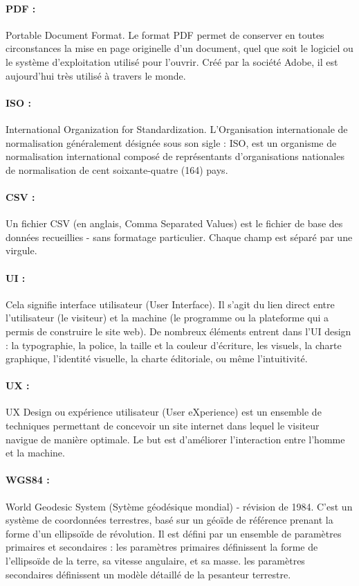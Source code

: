 \paragraph{PDF :}
Portable Document Format. Le format PDF permet de conserver en 
toutes circonstances la mise en page 
originelle d'un document, quel que soit le logiciel ou le système 
d'exploitation utilisé pour l'ouvrir. Créé par la société Adobe, 
il est aujourd'hui très utilisé à travers le monde.

\paragraph{ISO :}
International Organization for Standardization.
L'Organisation internationale de normalisation généralement désignée sous son
 sigle : ISO, est un organisme de normalisation international composé de 
 représentants d'organisations nationales de normalisation de cent soixante-quatre (164) pays.


\paragraph{CSV :}
Un fichier CSV (en anglais, Comma Separated Values) est le fichier de 
base des données recueillies - sans formatage particulier. Chaque 
champ est séparé par une virgule.

\paragraph{UI :}
Cela signifie interface utilisateur (User Interface). 
Il s’agit du lien direct entre l’utilisateur (le visiteur) 
et la machine (le programme ou la plateforme qui a permis de construire 
le site web). De nombreux éléments entrent dans l’UI design : la typographie, la police, la taille et la 
couleur d’écriture, les visuels, la charte graphique, l'identité visuelle, la
charte éditoriale, ou même l’intuitivité.

\paragraph{UX :}
UX Design ou expérience utilisateur (User eXperience) est un ensemble de techniques 
permettant de concevoir un site internet dans lequel le visiteur navigue 
de manière optimale. Le but est d’améliorer l’interaction entre l’homme 
et la machine. 

\paragraph{WGS84 :}
World Geodesic System (Sytème géodésique mondial) - révision de 1984.
C'est un système de coordonnées terrestres, basé sur un géoïde de référence 
prenant la forme d'un ellipsoïde de révolution. Il est 
défini par un ensemble de paramètres primaires et secondaires :
les paramètres primaires définissent la forme de l'ellipsoïde de la terre, sa vitesse angulaire, et sa masse.
les paramètres secondaires définissent un modèle détaillé de la pesanteur terrestre.
